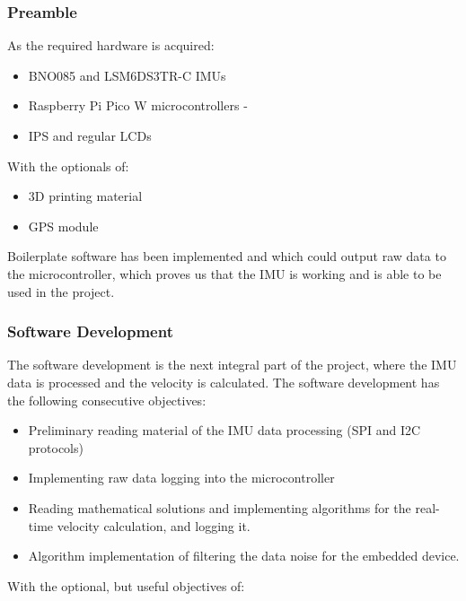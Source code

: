 \documentclass[
  10pt,
]{article}
\providecommand{\tightlist}{%
  \setlength{\itemsep}{0pt}\setlength{\parskip}{0pt}}
\begin{document}
\hypertarget{preamble}{%
\subsubsection{Preamble}\label{preamble}}

As the required hardware is acquired:

\begin{itemize}
\tightlist
\item
  BNO085 and LSM6DS3TR-C IMUs
\item
  Raspberry Pi Pico W microcontrollers -
\item
  IPS and regular LCDs
\end{itemize}

With the optionals of:

\begin{itemize}
\tightlist
\item
  3D printing material
\item
  GPS module
\end{itemize}

Boilerplate software has been implemented and which could output raw
data to the microcontroller, which proves us that the IMU is working and
is able to be used in the project.

\hypertarget{software-development}{%
\subsubsection{Software Development}\label{software-development}}

The software development is the next integral part of the project, where
the IMU data is processed and the velocity is calculated. The software
development has the following consecutive objectives:

\begin{itemize}
\tightlist
\item
  Preliminary reading material of the IMU data processing (SPI and I2C
  protocols)
\item
  Implementing raw data logging into the microcontroller
\item
  Reading mathematical solutions and implementing algorithms for the
  real-time velocity calculation, and logging it.
\item
  Algorithm implementation of filtering the data noise for the embedded
  device.
\end{itemize}

With the optional, but useful objectives of:
\end{document}
